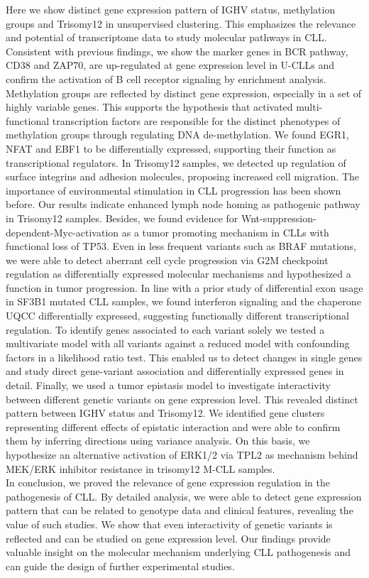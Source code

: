 Here we show distinct gene expression pattern of IGHV status, methylation groups and Trisomy12 in unsupervised clustering. This emphasizes the relevance and potential of transcriptome data to study molecular pathways in CLL. 
Consistent with previous findings, we show the marker genes in BCR pathway, CD38 and ZAP70, are up-regulated at gene expression level in U-CLLs and confirm the activation of B cell receptor signaling by enrichment analysis. Methylation groups are reflected by distinct gene expression, especially in a set of highly variable genes. This supports the hypothesis that activated multi-functional transcription factors are responsible for the distinct phenotypes of methylation groups through regulating DNA de-methylation. We found EGR1, NFAT and EBF1 to be differentially expressed, supporting their function as transcriptional regulators. In Trisomy12 samples, we detected up regulation of surface integrins and adhesion molecules, proposing increased cell migration. The importance of environmental stimulation in CLL progression has been shown before. Our results indicate enhanced lymph node homing as pathogenic pathway in Trisomy12 samples.  
Besides, we found evidence for Wnt-suppression-dependent-Myc-activation as a tumor promoting mechanism in CLLs with functional loss of TP53. Even in less frequent variants such as BRAF mutations, we were able to detect aberrant cell cycle progression via G2M checkpoint regulation as differentially expressed molecular mechanisms and hypothesized a function in tumor progression. In line with a prior study of differential exon usage in SF3B1 mutated CLL samples, we found interferon signaling and the chaperone UQCC differentially expressed, suggesting functionally different transcriptional regulation. To identify genes associated to each variant solely we tested a multivariate model with all variants against a reduced model with confounding factors in a likelihood ratio test. This enabled us to detect changes in single genes and study direct gene-variant association and differentially expressed genes in detail. Finally, we used a tumor epistasis model to investigate interactivity between different genetic variants on gene expression level. This revealed distinct pattern between IGHV status and Trisomy12. We identified gene clusters representing different effects of epistatic interaction and were able to confirm them by inferring directions using variance analysis. On this basis, we hypothesize an alternative activation of ERK1/2 via TPL2 as mechanism behind MEK/ERK inhibitor resistance in trisomy12 M-CLL samples.\\

In conclusion, we proved the relevance of gene expression regulation in the pathogenesis of CLL. By detailed analysis, we were able to detect gene expression pattern that can be related to genotype data and clinical features, revealing the value of such studies. We show that even interactivity of genetic variants is reflected and can be studied on gene expression level. Our findings provide valuable insight on the molecular mechanism underlying CLL pathogenesis and can guide the design of further experimental studies.
